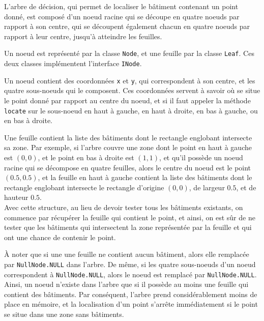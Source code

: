L'arbre de décision, qui permet de localiser le bâtiment contenant un point donné, est composé d'un noeud racine qui se découpe en quatre noeuds par rapport à son centre, qui se découpent également chacun en quatre noeuds par rapport à leur centre, jusqu'à atteindre les feuilles.

Un noeud est représenté par la classe \texttt{Node}, et une feuille par la classe \texttt{Leaf}. Ces deux classes implémentent l'interface \texttt{INode}.

Un noeud contient des coordonnées \texttt{x} et \texttt{y}, qui correspondent à son centre, et les quatre sous-noeuds qui le composent. Ces coordonnées servent à savoir où se situe le point donné par rapport au centre du noeud, et si il faut appeler la méthode \texttt{locate} sur le sous-noeud en haut à gauche, en haut à droite, en bas à gauche, ou en bas à droite.

Une feuille contient la liste des bâtiments dont le rectangle englobant intersecte sa zone. Par exemple, si l'arbre couvre une zone dont le point en haut à gauche est $(0, 0)$, et le point en bas à droite est $(1, 1)$, et qu'il possède un noeud racine qui se décompose en quatre feuilles, alors le centre du noeud est le point $(0.5, 0.5)$, et la feuille en haut à gauche contient la liste des bâtiments dont le rectangle englobant intersecte le rectangle d'origine $(0, 0)$, de largeur $0.5$, et de hauteur $0.5$.\\

Avec cette structure, au lieu de devoir tester tous les bâtiments existants, on commence par récupérer la feuille qui contient le point, et ainsi, on est sûr de ne tester que les bâtiments qui intersectent la zone représentée par la feuille et qui ont une chance de contenir le point.

\`{A} noter que si une une feuille ne contient aucun bâtiment, alors elle remplacée par \texttt{NullNode.NULL} dans l'arbre. De même, si les quatre sous-noeuds d'un noeud correspondent à \texttt{NullNode.NULL}, alors le noeud est remplacé par \texttt{NullNode.NULL}. Ainsi, un noeud n'existe dans l'arbre que si il possède au moins une feuille qui contient des bâtiments. Par conséquent, l'arbre prend considérablement moins de place en mémoire, et la localisation d'un point s'arrête immédiatement si le point se situe dans une zone sans bâtiments.